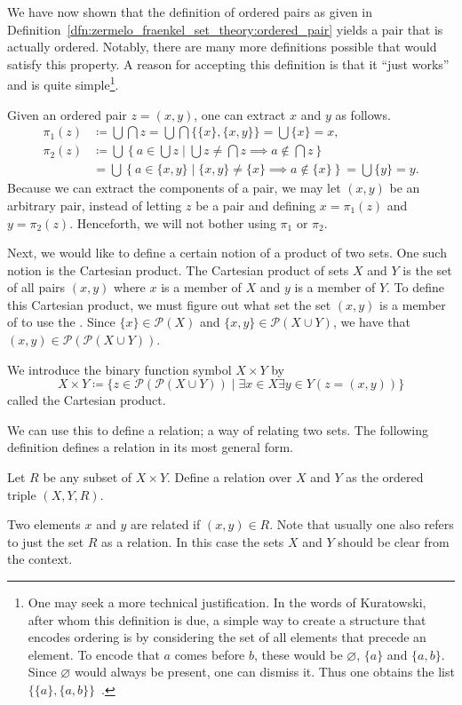 \documentclass[../main.tex]{subfiles}
\begin{document}
We have now shown that the definition of ordered pairs as given in Definition~\ref{dfn:zermelo_fraenkel_set_theory:ordered_pair} yields a pair that is actually ordered. Notably, there are many more definitions possible that would satisfy this property. A reason for accepting this definition is that it ``just works'' and is quite simple\footnote{One may seek a more technical justification. In the words of Kuratowski, after whom this definition is due, a simple way to create a structure that encodes ordering is by considering the set of all elements that precede an element. To encode that $a$ comes before $b$, these would be $\varnothing$, $\{a\}$ and $\{a,b\}$. Since $\varnothing$ would always be present, one can dismiss it. Thus one obtains the list $\{\{a\},\{a,b\}\}$~\cite{Kuratowski1921}.}.

Given an ordered pair $z=(x,y)$, one can extract $x$ and $y$ as follows.
\begin{align*}
    \pi_1(z) & \coloneq\bigcup\bigcap z=\bigcup\bigcap\{\{x\},\{x,y\}\}=\bigcup\{x\}=x, \\
    \pi_2(z) & \coloneq\bigcup\left\{a\in\bigcup z\mathrel{}\middle\vert\mathrel{}\bigcup z\neq\bigcap z\implies a\notin\bigcap z\right\} \\
    & =\bigcup\left\{a\in\{x,y\}\mid\{x,y\}\neq\{x\}\implies a\notin\{x\}\right\}=\bigcup\{y\}=y.
\end{align*}
Because we can extract the components of a pair, we may let $(x,y)$ be an arbitrary pair, instead of letting $z$ be a pair and defining $x=\pi_1(z)$ and $y=\pi_2(z)$. Henceforth, we will not bother using $\pi_1$ or $\pi_2$.

Next, we would like to define a certain notion of a product of two sets. One such notion is the Cartesian product. The Cartesian product of sets $X$ and $Y$ is the set of all pairs $(x,y)$ where $x$ is a member of $X$ and $y$ is a member of $Y$. To define this Cartesian product, we must figure out what set the set $(x,y)$ is a member of to use the . Since $\{x\}\in\mathcal{P}(X)$ and $\{x,y\}\in\mathcal{P}(X\cup Y)$, we have that $(x,y)\in\mathcal{P}(\mathcal{P}(X\cup Y))$.
\begin{definition}
    We introduce the binary function symbol $X\times Y$ by
    \begin{equation*}
        X\times Y\coloneq\{z\in\mathcal{P}(\mathcal{P}(X\cup Y))\mid\exists x\in X\exists y\in Y(z=(x,y))\}
    \end{equation*}
    called the Cartesian product.
\end{definition}
We can use this to define a relation; a way of relating two sets. The following definition defines a relation in its most general form.
\begin{definition}[Relation]\label{dfn:zermelo_fraenkel_set_theory:relation}
    Let $R$ be any subset of $X\times Y$. Define a relation over $X$ and $Y$ as the ordered triple $(X,Y,R)$.
\end{definition}
Two elements $x$ and $y$ are related if $(x,y)\in R$. Note that usually one also refers to just the set $R$ as a relation. In this case the sets $X$ and $Y$ should be clear from the context.
\end{document}
